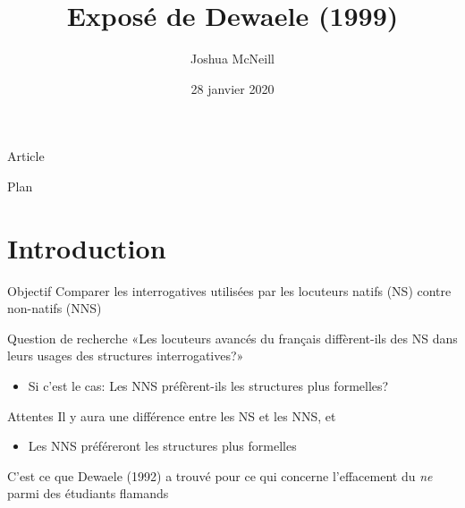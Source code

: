 \documentclass{beamer}
\author{Joshua McNeill}
\date{28 janvier 2020}
\title{Exposé de Dewaele (1999)}
\begin{document}
  \begin{frame}
    \titlepage
  \end{frame}

  \begin{frame}{Article}
  \end{frame}

  \begin{frame}{Plan}
    \tableofcontents
  \end{frame}


  \section{Introduction}
    \begin{frame}
      \begin{block}{Objectif}
        Comparer les interrogatives utilisées par les locuteurs natifs (NS) contre non-natifs (NNS)
      \end{block}
      \begin{block}{Question de recherche}
        «Les locuteurs avancés du français diffèrent-ils des NS dans leurs usages des structures interrogatives?»
        \begin{itemize}
          \item Si c'est le cas: Les NNS préfèrent-ils les structures plus formelles?
        \end{itemize}
      \end{block}
    \end{frame}

    \begin{frame}
      \begin{block}{Attentes}
        Il y aura une différence entre les NS et les NNS, et
        \begin{itemize}
          \item Les NNS préféreront les structures plus formelles
        \end{itemize}
        C'est ce que Dewaele (1992) a trouvé pour ce qui concerne l'effacement du \emph{ne} parmi des étudiants flamands
      \end{block}
    \end{frame}
\end{document}
